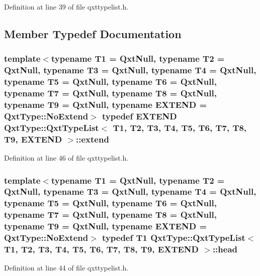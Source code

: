 Definition at line 39 of file qxttypelist.\-h.



\subsection{Member Typedef Documentation}
\hypertarget{struct_qxt_type_1_1_qxt_type_list_addaedde1404fa60e560a11eaeaef29ee}{
\subsubsection[{extend}]{\setlength{\rightskip}{0pt plus 5cm}template$<$typename T1  = Qxt\-Null, typename T2  = Qxt\-Null, typename T3  = Qxt\-Null, typename T4  = Qxt\-Null, typename T5  = Qxt\-Null, typename T6  = Qxt\-Null, typename T7  = Qxt\-Null, typename T8  = Qxt\-Null, typename T9  = Qxt\-Null, typename E\-X\-T\-E\-N\-D  = Qxt\-Type\-::\-No\-Extend$>$ typedef E\-X\-T\-E\-N\-D {\bf Qxt\-Type\-::\-Qxt\-Type\-List}$<$ T1, T2, T3, T4, T5, T6, T7, T8, T9, E\-X\-T\-E\-N\-D $>$\-::{\bf extend}}}\label{struct_qxt_type_1_1_qxt_type_list_addaedde1404fa60e560a11eaeaef29ee}


Definition at line 46 of file qxttypelist.\-h.

\hypertarget{struct_qxt_type_1_1_qxt_type_list_aa7da5ad3445f29c6e415dd4a2e91517a}{
\subsubsection[{head}]{\setlength{\rightskip}{0pt plus 5cm}template$<$typename T1  = Qxt\-Null, typename T2  = Qxt\-Null, typename T3  = Qxt\-Null, typename T4  = Qxt\-Null, typename T5  = Qxt\-Null, typename T6  = Qxt\-Null, typename T7  = Qxt\-Null, typename T8  = Qxt\-Null, typename T9  = Qxt\-Null, typename E\-X\-T\-E\-N\-D  = Qxt\-Type\-::\-No\-Extend$>$ typedef T1 {\bf Qxt\-Type\-::\-Qxt\-Type\-List}$<$ T1, T2, T3, T4, T5, T6, T7, T8, T9, E\-X\-T\-E\-N\-D $>$\-::{\bf head}}}\label{struct_qxt_type_1_1_qxt_type_list_aa7da5ad3445f29c6e415dd4a2e91517a}


Definition at line 44 of file qxttypelist.\-h.

